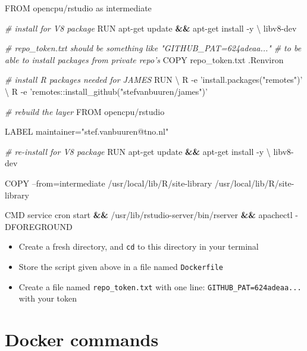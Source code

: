 \documentclass[]{book}
\newenvironment{Shaded}{\begin{snugshade}}{\end{snugshade}}
\newcommand{\CommentTok}[1]{\textcolor[rgb]{0.56,0.35,0.01}{\textit{#1}}}
\newcommand{\DataTypeTok}[1]{\textcolor[rgb]{0.13,0.29,0.53}{#1}}
\newcommand{\ExtensionTok}[1]{#1}
\newcommand{\KeywordTok}[1]{\textcolor[rgb]{0.13,0.29,0.53}{\textbf{#1}}}
\newcommand{\NormalTok}[1]{#1}
\newcommand{\StringTok}[1]{\textcolor[rgb]{0.31,0.60,0.02}{#1}}
\providecommand{\tightlist}{%
  \setlength{\itemsep}{0pt}\setlength{\parskip}{0pt}}
\begin{document}
\begin{Shaded}
\begin{Highlighting}[]
\ExtensionTok{FROM}\NormalTok{ opencpu/rstudio as intermediate}

\CommentTok{# install for V8 package}
\ExtensionTok{RUN}\NormalTok{ apt-get update }\KeywordTok{&&} \ExtensionTok{apt-get}\NormalTok{ install -y }\DataTypeTok{\textbackslash{} }
    \ExtensionTok{libv8-dev}

\CommentTok{# repo_token.txt should be something like "GITHUB_PAT=624adeaa..."}
\CommentTok{# to be able to install packages from private repo's}
\ExtensionTok{COPY}\NormalTok{ repo_token.txt .Renviron}

\CommentTok{# install R packages needed for JAMES}
\ExtensionTok{RUN}\NormalTok{ \textbackslash{}}
\NormalTok{    R -e }\StringTok{'install.packages("remotes")'}\NormalTok{ \textbackslash{}}
\NormalTok{    R -e }\StringTok{'remotes::install_github("stefvanbuuren/james")'}

\CommentTok{# rebuild the layer}
\ExtensionTok{FROM}\NormalTok{ opencpu/rstudio}

\ExtensionTok{LABEL}\NormalTok{ maintainer=}\StringTok{"stef.vanbuuren@tno.nl"} 

\CommentTok{# re-install for V8 package}
\ExtensionTok{RUN}\NormalTok{ apt-get update }\KeywordTok{&&} \ExtensionTok{apt-get}\NormalTok{ install -y }\DataTypeTok{\textbackslash{} }
    \ExtensionTok{libv8-dev}

\ExtensionTok{COPY}\NormalTok{ --from=intermediate /usr/local/lib/R/site-library /usr/local/lib/R/site-library}

\ExtensionTok{CMD}\NormalTok{ service cron start }\KeywordTok{&&} \ExtensionTok{/usr/lib/rstudio-server/bin/rserver} \KeywordTok{&&} \ExtensionTok{apachectl}\NormalTok{ -DFOREGROUND}
\end{Highlighting}
\end{Shaded}

\begin{itemize}
\tightlist
\item
  Create a fresh directory, and \texttt{cd} to this directory in your terminal
\item
  Store the script given above in a file named \texttt{Dockerfile}
\item
  Create a file named \texttt{repo\_token.txt} with one line: \texttt{GITHUB\_PAT=624adeaa...} with your token
\end{itemize}

\hypertarget{docker-commands}{%
\section{Docker commands}\label{docker-commands}}
\end{document}

